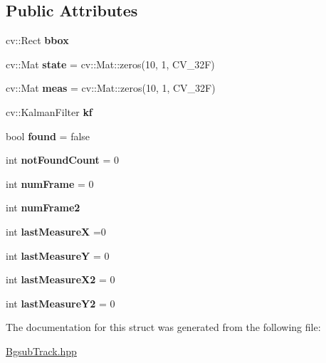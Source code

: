 \subsection*{Public Attributes}
\begin{DoxyCompactItemize}
\item 
cv\+::\+Rect {\bfseries bbox}\hypertarget{structklmFilter_aebb55ec94d73eb9e6b9e55210142d18a}{}\label{structklmFilter_aebb55ec94d73eb9e6b9e55210142d18a}

\item 
cv\+::\+Mat {\bfseries state} = cv\+::\+Mat\+::zeros(10, 1, C\+V\+\_\+32F)\hypertarget{structklmFilter_ae9aa8e0a2c64c061896811a79c40c3e8}{}\label{structklmFilter_ae9aa8e0a2c64c061896811a79c40c3e8}

\item 
cv\+::\+Mat {\bfseries meas} = cv\+::\+Mat\+::zeros(10, 1, C\+V\+\_\+32F)\hypertarget{structklmFilter_a08d603b4224ea0f36807373cd69010d4}{}\label{structklmFilter_a08d603b4224ea0f36807373cd69010d4}

\item 
cv\+::\+Kalman\+Filter {\bfseries kf}\hypertarget{structklmFilter_ab372c3789bca8646e769a063cc13cd03}{}\label{structklmFilter_ab372c3789bca8646e769a063cc13cd03}

\item 
bool {\bfseries found} = false\hypertarget{structklmFilter_a0e14d33fe07713b4d24a43f595ca413f}{}\label{structklmFilter_a0e14d33fe07713b4d24a43f595ca413f}

\item 
int {\bfseries not\+Found\+Count} = 0\hypertarget{structklmFilter_aed92ac043bda9f8c2ab1311c6ba04a64}{}\label{structklmFilter_aed92ac043bda9f8c2ab1311c6ba04a64}

\item 
int {\bfseries num\+Frame} = 0\hypertarget{structklmFilter_a39a17bcf4b65ac7f4fd3bd32b8f2b901}{}\label{structklmFilter_a39a17bcf4b65ac7f4fd3bd32b8f2b901}

\item 
int {\bfseries num\+Frame2}\hypertarget{structklmFilter_ae2a590a68405dc065802a2b657f56a02}{}\label{structklmFilter_ae2a590a68405dc065802a2b657f56a02}

\item 
int {\bfseries last\+MeasureX} =0\hypertarget{structklmFilter_a7f8e0d58eeab1e388750ad5d7f5bd7b6}{}\label{structklmFilter_a7f8e0d58eeab1e388750ad5d7f5bd7b6}

\item 
int {\bfseries last\+MeasureY} = 0\hypertarget{structklmFilter_a56da6c3a67cd60286f11dc003e45b974}{}\label{structklmFilter_a56da6c3a67cd60286f11dc003e45b974}

\item 
int {\bfseries last\+Measure\+X2} = 0\hypertarget{structklmFilter_a95fb7b045189a2822b17cebdfea5d681}{}\label{structklmFilter_a95fb7b045189a2822b17cebdfea5d681}

\item 
int {\bfseries last\+Measure\+Y2} = 0\hypertarget{structklmFilter_abc02ad4246d2a1e1a920e1874bc45c77}{}\label{structklmFilter_abc02ad4246d2a1e1a920e1874bc45c77}

\end{DoxyCompactItemize}


The documentation for this struct was generated from the following file\+:\begin{DoxyCompactItemize}
\item 
\hyperlink{BgsubTrack_8hpp}{Bgsub\+Track.\+hpp}\end{DoxyCompactItemize}
